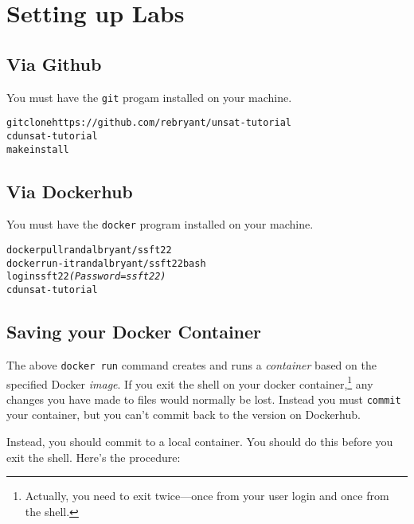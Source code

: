 \documentclass[12pt]{article}
\newenvironment{code}{\begin{alltt}\small}{\end{alltt}}
\begin{document}
\newpage

\section*{Setting up Labs}

\subsection*{Via Github}

You must have the {\tt git} progam installed on your machine.

\begin{code}
    git clone https://github.com/rebryant/unsat-tutorial
    cd unsat-tutorial
    make install
\end{code}

\subsection*{Via Dockerhub}

You must have the {\tt docker} program installed on your machine.

\begin{code}
    docker pull randalbryant/ssft22
    docker run -it randalbryant/ssft22 bash
    login ssft22 \textit{(Password = ssft22)}
    cd unsat-tutorial
\end{code}

\subsection*{Saving your Docker Container}


The above \texttt{docker run} command creates and runs a {\em
  container} based on the specified Docker {\em image}.  If you exit the shell
on your docker container,\footnote{Actually, you need to exit twice---once from your user login and once from the shell.}
any changes you have made to files
would normally be lost.  Instead you must \texttt{commit} your
container, but you can't commit back to the version on Dockerhub.

Instead, you should commit to a local container.  You should do this
before you exit the shell.  Here's the procedure:
\end{document}
